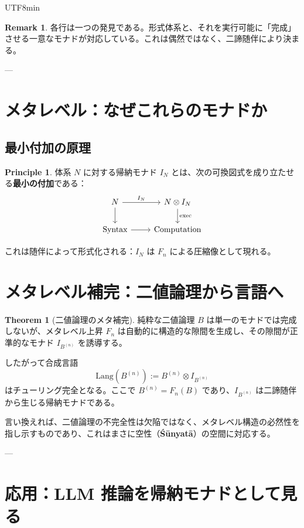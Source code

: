 \documentclass[a4paper,11pt]{article}
\renewcommand{\emph}[1]{\textbf{#1}}
\theoremstyle{definition}
\newtheorem{theorem}{Theorem}[section]
\newtheorem{remark}{Remark}[section]
\newtheorem{principle}{Principle}[section]
\begin{document}
\begin{CJK}{UTF8}{min}
\begin{remark}
各行は一つの発見である。形式体系と、それを実行可能に「完成」させる一意なモナドが対応している。これは偶然ではなく、二諦随伴により決まる。
\end{remark}

---

\section{メタレベル：なぜこれらのモナドか}

\subsection{最小付加の原理}

\begin{principle}
体系 $N$ に対する帰納モナド $I_N$ とは、次の可換図式を成り立たせる\emph{最小の付加}である：
\[
\begin{tikzcd}
N \arrow[r, "I_N"] \arrow[d] & N \otimes I_N \arrow[d, "\text{exec}"] \\
\text{Syntax} \arrow[r] & \text{Computation}
\end{tikzcd}
\]
\end{principle}

これは随伴によって形式化される：$I_N$ は $F_n$ による圧縮像として現れる。

\section{メタレベル補完：二値論理から言語へ}

\begin{theorem}[二値論理のメタ補完]
純粋な二値論理 $B$ は単一のモナドでは完成しないが、メタレベル上昇 $F_n$ は自動的に構造的な隙間を生成し、その隙間が正準的なモナド $I_{B^{(n)}}$ を誘導する。

したがって合成言語
\[
  \text{Lang}(B^{(n)}) := B^{(n)} \otimes I_{B^{(n)}}
\]
はチューリング完全となる。ここで $B^{(n)} = F_n(B)$ であり、$I_{B^{(n)}}$ は二諦随伴から生じる帰納モナドである。

言い換えれば、二値論理の不完全性は欠陥ではなく、メタレベル構造の必然性を指し示すものであり、これはまさに空性（\emph{Śūnyatā}）の空間に対応する。
\end{theorem}

---

\section{応用：LLM 推論を帰納モナドとして見る}


\end{CJK}
\end{document}
